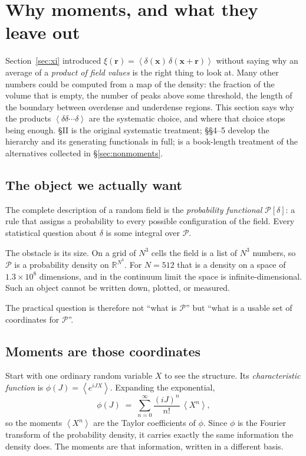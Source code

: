\documentclass[12pt]{article}
\newcommand{\bx}{\mathbf{x}}
\newcommand{\br}{\mathbf{r}}
\newcommand{\avg}[1]{\left\langle #1 \right\rangle}
\begin{document}
\section{Why moments, and what they leave out}
\label{sec:whymoments}

Section~\ref{sec:xi} introduced $\xi(\br) = \avg{\delta(\bx)\,\delta(\bx+\br)}$
without saying why an average of a \emph{product of field values} is the
right thing to look at.  Many other numbers could be computed from a map
of the density: the fraction of the volume that is empty, the number of
peaks above some threshold, the length of the boundary between
overdense and underdense regions.  This section says why the products
$\avg{\delta\delta\cdots\delta}$ are the systematic choice, and where
that choice stops being enough.  \citet{Peebles1980} \S II is the
original systematic treatment; \citet{Bernardeau2002} \S\S4--5 develop
the hierarchy and its generating functionals in full;
\citet{MartinezSaar2002} is a book-length treatment of the alternatives
collected in \S\ref{sec:nonmoments}.

\subsection{The object we actually want}
\label{sec:pfunctional}

The complete description of a random field is the \emph{probability
functional} $\mathcal P[\delta]$: a rule that assigns a probability to
every possible configuration of the field.  Every statistical question
about $\delta$ is some integral over $\mathcal P$.

The obstacle is its size.  On a grid of $N^3$ cells the field is a list
of $N^3$ numbers, so $\mathcal P$ is a probability density on
$\mathbb R^{N^3}$.  For $N = 512$ that is a density on a space of
$1.3\times 10^{8}$ dimensions, and in the continuum limit the space is
infinite-dimensional.  Such an object cannot be written down, plotted,
or measured.

The practical question is therefore not ``what is $\mathcal P$'' but
``what is a usable set of coordinates for $\mathcal P$''.

\subsection{Moments are those coordinates}
\label{sec:momentcoords}

Start with one ordinary random variable $X$ to see the structure.  Its
\emph{characteristic function} is $\phi(J) = \avg{e^{iJX}}$.  Expanding
the exponential,
\begin{equation}
  \phi(J) \;=\; \sum_{n=0}^{\infty} \frac{(iJ)^n}{n!}\,\avg{X^n},
  \label{eq:charfn}
\end{equation}
so the moments $\avg{X^n}$ are the Taylor coefficients of $\phi$.  Since
$\phi$ is the Fourier transform of the probability density, it carries
exactly the same information the density does.  The moments are that
information, written in a different basis.
\end{document}
